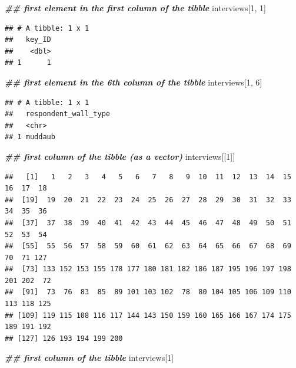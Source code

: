 \documentclass[
]{article}
\newenvironment{Shaded}{\begin{snugshade}}{\end{snugshade}}
\newcommand{\DecValTok}[1]{\textcolor[rgb]{0.00,0.00,0.81}{#1}}
\newcommand{\DocumentationTok}[1]{\textcolor[rgb]{0.56,0.35,0.01}{\textbf{\textit{#1}}}}
\newcommand{\NormalTok}[1]{#1}
\begin{document}
\begin{Shaded}
\begin{Highlighting}[]
\DocumentationTok{\#\# first element in the first column of the tibble}
\NormalTok{interviews[}\DecValTok{1}\NormalTok{, }\DecValTok{1}\NormalTok{]}
\end{Highlighting}
\end{Shaded}

\begin{verbatim}
## # A tibble: 1 x 1
##   key_ID
##    <dbl>
## 1      1
\end{verbatim}

\begin{Shaded}
\begin{Highlighting}[]
\DocumentationTok{\#\# first element in the 6th column of the tibble }
\NormalTok{interviews[}\DecValTok{1}\NormalTok{, }\DecValTok{6}\NormalTok{]}
\end{Highlighting}
\end{Shaded}

\begin{verbatim}
## # A tibble: 1 x 1
##   respondent_wall_type
##   <chr>               
## 1 muddaub
\end{verbatim}

\begin{Shaded}
\begin{Highlighting}[]
\DocumentationTok{\#\# first column of the tibble (as a vector)}
\NormalTok{interviews[[}\DecValTok{1}\NormalTok{]]}
\end{Highlighting}
\end{Shaded}

\begin{verbatim}
##   [1]   1   2   3   4   5   6   7   8   9  10  11  12  13  14  15  16  17  18
##  [19]  19  20  21  22  23  24  25  26  27  28  29  30  31  32  33  34  35  36
##  [37]  37  38  39  40  41  42  43  44  45  46  47  48  49  50  51  52  53  54
##  [55]  55  56  57  58  59  60  61  62  63  64  65  66  67  68  69  70  71 127
##  [73] 133 152 153 155 178 177 180 181 182 186 187 195 196 197 198 201 202  72
##  [91]  73  76  83  85  89 101 103 102  78  80 104 105 106 109 110 113 118 125
## [109] 119 115 108 116 117 144 143 150 159 160 165 166 167 174 175 189 191 192
## [127] 126 193 194 199 200
\end{verbatim}

\begin{Shaded}
\begin{Highlighting}[]
\DocumentationTok{\#\# first column of the tibble}
\NormalTok{interviews[}\DecValTok{1}\NormalTok{]}
\end{Highlighting}
\end{Shaded}
\end{document}

